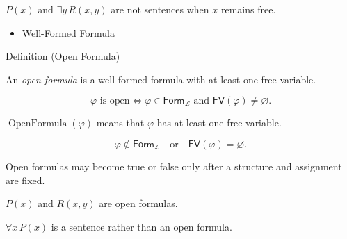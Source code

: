 \begin{remark*}
\(P(x)\) and \(\exists y\,R(x,y)\) are not sentences when \(x\) remains free.
\end{remark*}

\begin{dependencies}
\begin{itemize}
  \item \hyperref[def:wff-pred]{Well-Formed Formula}
\end{itemize}
\end{dependencies}

\begin{definitionbox}{Definition (Open Formula)}
\begin{definition}
\label{def:open-formula-quantifiers}
An \emph{open formula} is a well-formed formula with at least one free
variable.
\end{definition}
\end{definitionbox}

\begin{remark*}
\[
\varphi \text{ is open}
\Longleftrightarrow
\varphi\in\mathsf{Form}_{\mathcal L}
\text{ and }
\mathsf{FV}(\varphi)\neq\varnothing.
\]
\end{remark*}

\begin{remark*}
\(\operatorname{OpenFormula}(\varphi)\) means that \(\varphi\) has at least one
free variable.
\end{remark*}

\begin{remark*}
\[
\varphi\notin\mathsf{Form}_{\mathcal L}
\quad\text{or}\quad
\mathsf{FV}(\varphi)=\varnothing.
\]
\end{remark*}

\begin{remark*}[Interpretation]
Open formulas may become true or false only after a structure and assignment
are fixed.
\end{remark*}

\begin{remark*}[Examples]
\(P(x)\) and \(R(x,y)\) are open formulas.
\end{remark*}

\begin{remark*}
\(\forall x\,P(x)\) is a sentence rather than an open formula.
\end{remark*}

